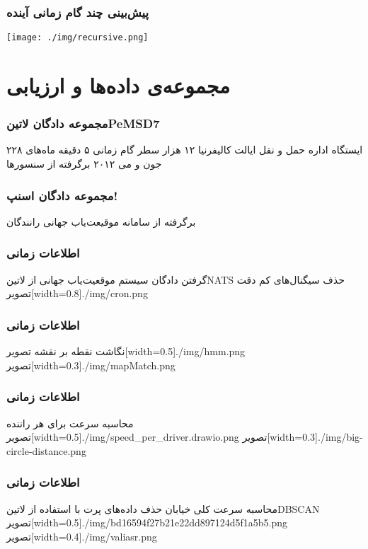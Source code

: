 \documentclass{beamer}
\begin{document}
\begin{frame}
  \frametitle{پیش‌بینی چند گام زمانی آینده}
  \texttt{[image: ./img/recursive.png]}
\end{frame}

\section{مجموعه‌ی داده‌ها و ارزیابی}

\begin{frame}
  \frametitle{مجموعه دادگان ‌لاتین{PeMSD7}}
   ۲۲۸ ایستگاه اداره حمل و نقل ایالت کالیفرنیا
   ۱۲ هزار سطر
   گام زمانی ۵ دقیقه
   ماه‌های جون و می ۲۰۱۲
   برگرفته از سنسورها
\end{frame}

\begin{frame}
  \frametitle{مجموعه دادگان اسنپ!}
   برگرفته از سامانه موقیعت‌یاب جهانی رانندگان
\end{frame}

\begin{frame}
  \frametitle{اطلاعات زمانی}
   گرفتن دادگان سیستم موقعیت‌یاب جهانی از ‌لاتین{NATS}
   حذف سیگنال‌های کم دقت
  ‌تصویر[width=0.8\textwidth]{./img/cron.png}
\end{frame}

\begin{frame}
  \frametitle{اطلاعات زمانی}
  \setcounter{enumi}{1}
   نگاشت نقطه بر نقشه
  ‌تصویر[width=0.5\textwidth]{./img/hmm.png}
  \hfill
  ‌تصویر[width=0.3\textwidth]{./img/mapMatch.png}
\end{frame}

\begin{frame}
  \frametitle{اطلاعات زمانی}
  \setcounter{enumi}{2}
   محاسبه سرعت برای هر راننده
  ‌تصویر[width=0.5\textwidth]{./img/speed_per_driver.drawio.png}
  \hfill
  ‌تصویر[width=0.3\textwidth]{./img/big-circle-distance.png}
\end{frame}

\begin{frame}
  \frametitle{اطلاعات زمانی}
  \setcounter{enumi}{3}
   محاسبه سرعت کلی خیابان
   حذف داده‌های پرت با استفاده از ‌لاتین{DBSCAN}
  ‌تصویر[width=0.5\textwidth]{./img/bd16594f27b21e22dd897124d5f1a5b5.png}
  \hfill
  ‌تصویر[width=0.4\textwidth]{./img/valiasr.png}
\end{frame}
\end{document}
